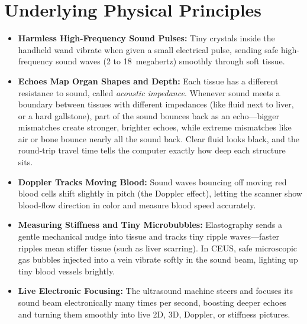 \section{Underlying Physical Principles}
\begin{itemize}
  \item \textbf{Harmless High-Frequency Sound Pulses:} Tiny crystals inside the handheld wand vibrate when given a small electrical pulse, sending safe high-frequency sound waves (2 to 18~megahertz) smoothly through soft tissue.
  \item \textbf{Echoes Map Organ Shapes and Depth:} Each tissue has a different resistance to sound, called \textit{acoustic impedance}. Whenever sound meets a boundary between tissues with different impedances (like fluid next to liver, or a hard gallstone), part of the sound bounces back as an echo---bigger mismatches create stronger, brighter echoes, while extreme mismatches like air or bone bounce nearly all the sound back. Clear fluid looks black, and the round-trip travel time tells the computer exactly how deep each structure sits.
  \item \textbf{Doppler Tracks Moving Blood:} Sound waves bouncing off moving red blood cells shift slightly in pitch (the Doppler effect), letting the scanner show blood-flow direction in color and measure blood speed accurately.
  \item \textbf{Measuring Stiffness and Tiny Microbubbles:} Elastography sends a gentle mechanical nudge into tissue and tracks tiny ripple waves---faster ripples mean stiffer tissue (such as liver scarring). In CEUS, safe microscopic gas bubbles injected into a vein vibrate softly in the sound beam, lighting up tiny blood vessels brightly.
  \item \textbf{Live Electronic Focusing:} The ultrasound machine steers and focuses its sound beam electronically many times per second, boosting deeper echoes and turning them smoothly into live 2D, 3D, Doppler, or stiffness pictures.
\end{itemize}

